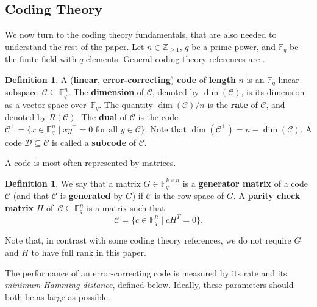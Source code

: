 \documentclass[11pt,a4paper]{article}
\theoremstyle{definition}
\newtheorem{definition}[theorem]{Definition}
\newcommand{\numberset}{\mathbb}
\newcommand{\F}{\numberset{F}}
\newcommand{\Z}{\numberset{Z}}
\newcommand{\mC}{\mathcal{C}}
\newcommand{\mD}{\mathcal{D}}
\begin{document}
\subsection{Coding Theory}
\label{subsec:coding}

We now turn to the coding theory fundamentals, that are also 
needed to understand the rest of the paper. Let $n \in \Z_{\ge 1}$, $q$ be a prime power, and $\F_q$ be the finite field with $q$ elements. 
General coding theory references are \cite{macwilliams1977theory,huffman2010fundamentals,pellikaan2018}.


\begin{definition}
A (\textbf{linear}, \textbf{error-correcting}) \textbf{code} of
\textbf{length} $n$ is
an $\F_q$-linear subspace~$\mC \subseteq \F_q^n$.
The \textbf{dimension} of $\mC$, denoted by $\dim(\mC)$, is its 
dimension as a vector space over~$\F_q$.
The quantity $\dim(\mC)/n$ is the \textbf{rate} of $\mC$, and denoted by $R(\mC)$.
The \textbf{dual} of $\mC$ 
is the code~$\mC^\perp = \{x \in \F_q^n \mid xy^\top =0 \mbox{ for all } y \in \mC\}$. Note that $\dim(\mC^\perp) = n - \dim(\mC)$.
A code $\mD \subseteq \mC$ is called a \textbf{subcode} of $\mC$.
\end{definition}



A code is most often represented by matrices.




\begin{definition}
\label{def:parity}
We say that a matrix $G \in \F_q^{k \times n}$ is a \textbf{generator matrix} of a code $\mC$ (and that $\mC$ is \textbf{generated} by $G$) if $\mC$ is the row-space of $G$. 
A \textbf{parity check matrix} $H$ of~$\mC \subseteq \F_q^n$ is a matrix such that
$$\mC=\{c \in \F_q^n \mid cH^T=0\}.$$
\end{definition}

Note that, in contrast with some coding theory references, we do not require $G$ and $H$ to have full rank in this paper. 

The performance of an 
error-correcting code is measured by its rate and its \textit{minimum Hamming distance}, defined below. Ideally, these parameters should both be as large as possible.
\end{document}
